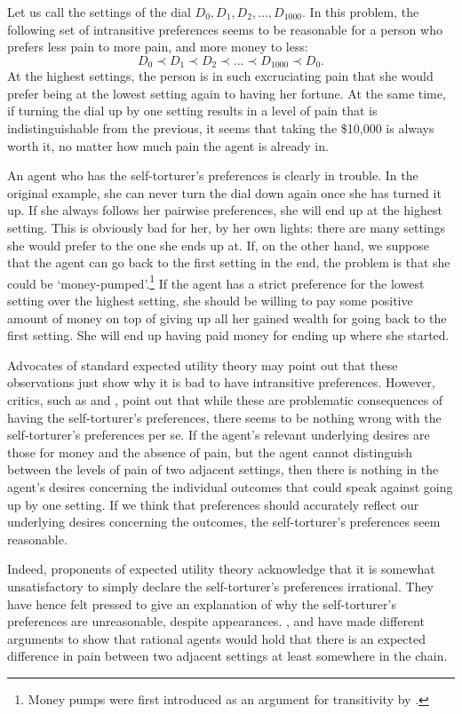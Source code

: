 Let us call the settings of the dial $D_0, D_1, D_2,\ldots, D_{1000}$. In this problem, the following set of intransitive preferences seems to be reasonable for a person who prefers less pain to more pain, and more money to less:
$$D_0 \prec D_1 \prec D_2 \prec \ldots \prec D_{1000} \prec D_0.$$
At the highest settings, the person is in such excruciating pain that she would prefer being at the lowest setting again to having her fortune. At the same time, if turning the dial up by one setting results in a level of pain that is indistinguishable from the previous, it seems that taking the \$10,000 is always worth it, no matter how much pain the agent is already in.

An agent who has the self-torturer's preferences is clearly in trouble. In the original example, she can never turn the dial down again once she has turned it up. If she always follows her pairwise preferences, she will end up at the highest setting. This is obviously bad for her, by her own lights: there are many settings she would prefer to the one she ends up at. If, on the other hand, we suppose that the agent can go back to the first setting in the end, the problem is that she could be `money-pumped'.\footnote{Money pumps were first introduced as an argument for transitivity by \citet{DavidsonMcKinseySuppes1955}.} If the agent has a strict preference for the lowest setting over the highest setting, she should be willing to pay some positive amount of money on top of giving up all her gained wealth for going back to the first setting. She will end up having paid money for ending up where she started.

Advocates of standard expected utility theory may point out that these observations just show why it is bad to have intransitive preferences. However, critics, such as \citet{Andreou2006} and \citet{TenenbaumRaffman2012}, point out that while these are problematic consequences of having the self-torturer's preferences, there seems to be nothing wrong with the self-torturer's preferences per se. If the agent's relevant underlying desires are those for money and the absence of pain, but the agent cannot distinguish between the levels of pain of two adjacent settings, then there is nothing in the agent's desires concerning the individual outcomes that could speak against going up by one setting. If we think that preferences should accurately reflect our underlying desires concerning the outcomes, the self-torturer's preferences seem reasonable.

Indeed, proponents of expected utility theory acknowledge that it is somewhat unsatisfactory to simply declare the self-torturer's preferences irrational. They have hence felt pressed to give an explanation of why the self-torturer's preferences are unreasonable, despite appearances. \citet{ArntzeniusMcCarthy1997}, and \citet{VoorhoeveBinmore2006} have made different arguments to show that rational agents would hold that there is an expected difference in pain between two adjacent settings at least somewhere in the chain.

